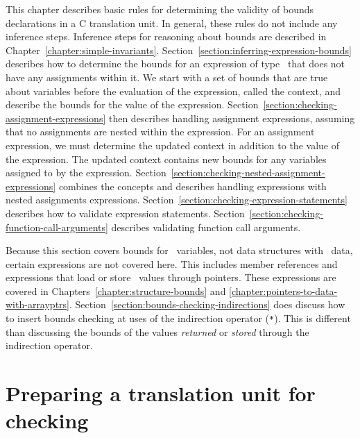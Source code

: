 This chapter describes basic rules for determining the validity of
bounds declarations in a C translation unit. In general, these rules do
not include any inference steps. Inference steps for reasoning about
bounds are described in Chapter~\ref{chapter:simple-invariants}.
Section~\ref{section:inferring-expression-bounds}
describes how to determine the bounds for an expression of
type \arrayptr\ that does not have any assignments within it.
We start with a set of bounds that are true about variables before the
evaluation of the expression, called the context, and describe the
bounds for the value of the expression.
Section~\ref{section:checking-assignment-expressions}
then describes handling assignment expressions, assuming
that no assignments are nested within the expression. For an assignment
expression, we must determine the updated context in addition to the
value of the expression. The updated context contains new bounds for any
variables assigned to by the expression.
Section~\ref{section:checking-nested-assignment-expressions}
combines the concepts and describes handling expressions
with nested assignments expressions.
Section~\ref{section:checking-expression-statements} 
describes how to validate expression statements. 
Section~\ref{section:checking-function-call-arguments}
describes validating function call arguments.

Because this section covers bounds for \arrayptr\ variables,
not data structures with \arrayptr\ data, certain expressions
are not covered here. This includes member references and expressions
that load or store \arrayptr\ values through pointers. These
expressions are covered in Chapters~\ref{chapter:structure-bounds} and
\ref{chapter:pointers-to-data-with-arrayptrs}.
Section~\ref{section:bounds-checking-indirections} does discuss how to 
insert bounds checking at uses of the
indirection operator (\lstinline|*|). This is different than discussing the
bounds of the values \emph{returned} or \emph{stored} through the
indirection operator.

\section{Preparing a translation unit for checking}

